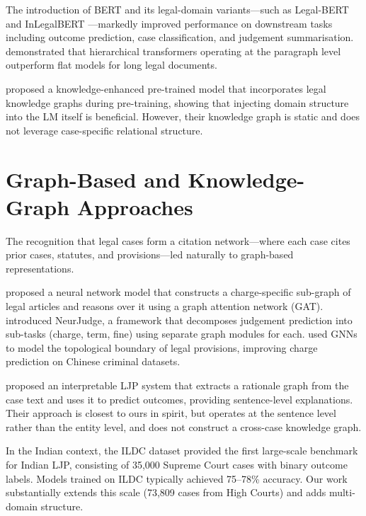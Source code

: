 \documentclass[12pt,a4paper]{report}
\begin{document}
The introduction of BERT \citep{devlin2018bert} and its legal-domain variants---such as Legal-BERT \citep{chalkidis2020legal} and InLegalBERT \citep{paul2022towards}---markedly improved performance on downstream tasks including outcome prediction, case classification, and judgement summarisation. \citet{chalkidis2021paragraph} demonstrated that hierarchical transformers operating at the paragraph level outperform flat models for long legal documents.

\citet{feng2022legal} proposed a knowledge-enhanced pre-trained model that incorporates legal knowledge graphs during pre-training, showing that injecting domain structure into the LM itself is beneficial. However, their knowledge graph is static and does not leverage case-specific relational structure.

\section{Graph-Based and Knowledge-Graph Approaches}

The recognition that legal cases form a citation network---where each case cites prior cases, statutes, and provisions---led naturally to graph-based representations.

\citet{li2021neural} proposed a neural network model that constructs a charge-specific sub-graph of legal articles and reasons over it using a graph attention network (GAT). \citet{yue2021neurjudge} introduced NeurJudge, a framework that decomposes judgement prediction into sub-tasks (charge, term, fine) using separate graph modules for each. \citet{yang2022boundary} used GNNs to model the topological boundary of legal provisions, improving charge prediction on Chinese criminal datasets.

\citet{sun2022interpretable} proposed an interpretable LJP system that extracts a rationale graph from the case text and uses it to predict outcomes, providing sentence-level explanations. Their approach is closest to ours in spirit, but operates at the sentence level rather than the entity level, and does not construct a cross-case knowledge graph.

In the Indian context, the ILDC dataset \citep{malik2021ildc} provided the first large-scale benchmark for Indian LJP, consisting of 35,000 Supreme Court cases with binary outcome labels. Models trained on ILDC typically achieved 75--78\% accuracy. Our work substantially extends this scale (73,809 cases from High Courts) and adds multi-domain structure.
\end{document}
